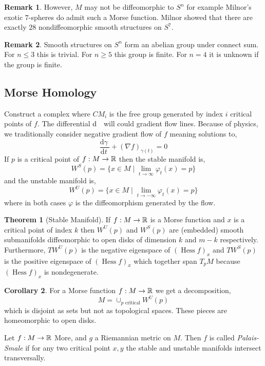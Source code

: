 \documentclass[12pt]{extarticle}
\renewcommand{\d}[1]{ \mathrm{d}#1 \:}
\newcommand{\deriv}[2]{\frac{\d{#1}}{\d{#2}}}
\DeclareMathOperator{\Hess}{\mathrm{Hess}}
\theoremstyle{definition}
\newtheorem{theorem}{Theorem}[section]
\newtheorem{corollary}[theorem]{Corollary}
\newtheorem{remark}{Remark}
\newenvironment{definition}[1][Definition:]{\begin{trivlist}
\item[\hskip \labelsep {\bfseries #1}]}{\end{trivlist}}
\begin{document}
\begin{remark}
However, $M$ may not be diffeomorphic to $S^n$ for example Milnor's exotic $7$-spheres do admit such a Morse function. Milnor showed that there are exactly $28$ nondiffeomorphic smooth structures on $S^7$.
\end{remark}

\begin{remark}
Smooth structures on $S^n$ form an abelian group under connect sum. For $n \le 3$ this is trivial. For $n \ge 5$ this group is finite. For $n = 4$ it is unknown if the group is finite.  
\end{remark}

\subsection{Morse Homology}

Construct a complex where $CM_i$ is the free group generated by index $i$ critical points of $f$. The differential $\d$ will could gradient flow lines. Because of physics, we traditionally consider negative gradient flow of $f$ meaning solutions to,
\[ \deriv{\gamma}{t} + (\nabla f)_{\gamma(t)} = 0 \]
If $p$ is a critical point of $f : M \to \mathbb{R}$ then the stable manifold is,
\[ W^S(p) = \{ x \in M \mid \lim_{t \to \infty} \varphi_{t}(x) = p \} \]
and the unstable manifold is,
\[ W^U(p) = \{ x \in M \mid \lim_{t \to -\infty} \varphi_{t}(x) = p \} \]
where in both cases $\varphi$ is the diffeomorphism generated by the flow. 

\begin{theorem}[Stable Manifold]
If $f : M \to \mathbb{R}$ is a Morse function and $x$ is a critical point of index $k$ then $W^U(p)$ and $W^S(p)$ are (embedded) smooth submanifolds diffeomorphic to open disks of dimension $k$ and $m-k$ respectively. Furthermore, $T W^U(p)$ is the negative eigenspace of $(\Hess f)_x$ and $T W^S(p)$ is the positive eigenspace of $(\Hess f)_x$ which together span $T_p M$ because $(\Hess f)_x$ is nondegenerate. 
\end{theorem}

\begin{corollary}
For a Morse function $f : M \to \mathbb{R}$ we get a decomposition,
\[ M = \cup_{p \text{ critical}} W^U(p) \]
which is disjoint as sets but not as topological spaces. These pieces are homeomorphic to open disks. 
\end{corollary}

\begin{definition}
Let $f : M \to \mathbb{R}$ More, and $g$ a Riemannian metric on $M$. Then $f$ is called \textit{Palais-Smale} if for any two critical point $x, y$ the stable and unstable manifolds intersect transversally. 
\end{definition}
\end{document}
